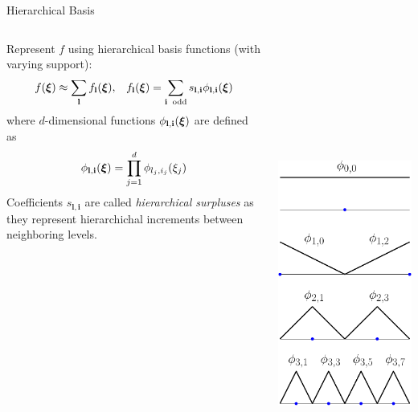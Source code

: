 \documentclass[final]{beamer}
\newcommand {\bxi} {\mbox{\boldmath $\xi$}}%
\newcommand{\bl}{\ensuremath{\mathbf{l}}} %
\newcommand{\bi}{\ensuremath{\mathbf{i}}} %
\begin{document}
\begin{frame}{}
{\begin{columns}[t]
\begin{column}{.30\linewidth}
\begin{block}{\centering Hierarchical Basis}
\begin{columns}[T]
\begin{column}{22cm}{}
Represent $f$ using hierarchical basis functions (with varying support):\\
\begin{equation*}
f(\bxi) \approx \sum\limits_{\bl} f_{\bl}(\bxi), \;\;\; f_{\bl}(\bxi) = \sum\limits_{\bi\;\;\text{odd}}  s_{\bl,\bi} \phi_{\bl,\bi}(\bxi)
\end{equation*}
\noindent
where $d$-dimensional functions $\phi_{\bl,\bi}(\bxi)$ are defined as
\begin{equation*}
\phi_{\bl,\bi}(\bxi) = \prod_{j=1}^d \phi_{l_j,i_j}(\xi_j)
\end{equation*}
Coefficients $s_{\bl,\bi}$ are called \textit{hierarchical surpluses} as they represent hierarchichal increments between neighboring levels.
\end{column}
\begin{column}{12cm}{}
\centering\includegraphics[height=16cm, width = 10cm]{figures/hierbasis_v2} \\

\end{column}
\end{columns}
\end{block}
\end{column}
\end{columns}}
\end{frame}
\end{document}
